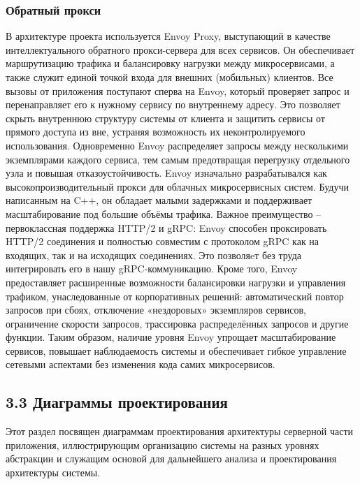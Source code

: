 \subsubsection*{Обратный прокси}
В архитектуре проекта используется Envoy Proxy, выступающий в качестве интеллектуального обратного прокси-сервера для всех сервисов. Он обеспечивает маршрутизацию трафика и балансировку нагрузки между микросервисами, а также служит единой точкой входа для внешних (мобильных) клиентов. Все вызовы от приложения поступают сперва на Envoy, который проверяет запрос и перенаправляет его к нужному сервису по внутреннему адресу. Это позволяет скрыть внутреннюю структуру системы от клиента и защитить сервисы от прямого доступа из вне, устраняя возможность их неконтролируемого использования. Одновременно Envoy распределяет запросы между несколькими экземплярами каждого сервиса, тем самым предотвращая перегрузку отдельного узла и повышая отказоустойчивость.
Envoy изначально разрабатывался как высокопроизводительный прокси для облачных микросервисных систем. Будучи написанным на C++, он обладает малыми задержками и поддерживает масштабирование под большие объёмы трафика. Важное преимущество – первоклассная поддержка HTTP/2 и gRPC: Envoy способен проксировать HTTP/2 соединения и полностью совместим с протоколом gRPC как на входящих, так и на исходящих соединениях. Это позволяeт без труда интегрировать его в нашу gRPC-коммуникацию. Кроме того, Envoy предоставляет расширенные возможности балансировки нагрузки и управления трафиком, унаследованные от корпоративных решений: автоматический повтор запросов при сбоях, отключение «нездоровых» экземпляров сервисов, ограничение скорости запросов, трассировка распределённых запросов и другие функции. Таким образом, наличие уровня Envoy упрощает масштабирование сервисов, повышает наблюдаемость системы и обеспечивает гибкое управление сетевыми аспектами без изменения кода самих микросервисов.

\subsection*{3.3 Диаграммы проектирования}
Этот раздел посвящен диаграммам проектирования архитектуры серверной части приложения, иллюстрирующим организацию системы на разных уровнях абстракции и служащим основой для дальнейшего анализа и проектирования архитектуры системы.

